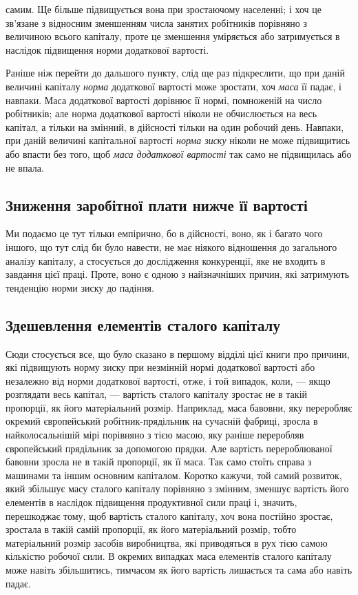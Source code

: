 \parcont{}  %
самим. Ще більше підвищується вона при зростаючому населенні; і хоч це зв’язане з відносним
зменшенням числа занятих робітників порівняно з величиною всього капіталу, проте це зменшення
уміряється або затримується в наслідок підвищення норми додаткової вартості.

Раніше ніж перейти до дальшого пункту, слід ще раз підкреслити, що при даній величині капіталу \emph{норма}
додаткової вартості може зростати, хоч \emph{маса} її падає, і навпаки. Маса додаткової вартості дорівнює
її нормі, помноженій на число робітників; але норма додаткової вартості ніколи не обчислюється на
весь капітал, а тільки на змінний, в дійсності тільки на один робочий день. Навпаки, при даній
величині капітальної вартості \emph{норма зиску} ніколи не може підвищитись або впасти без того, щоб \emph{маса
додаткової вартості} так само не підвищилась або не впала.

\subsection{Зниження заробітної плати нижче її вартості}

Ми подаємо це тут тільки емпірично, бо в дійсності, воно, як і багато чого іншого, що тут слід би
було навести, не має ніякого відношення до загального аналізу капіталу, а стосується до дослідження
конкуренції, яке не входить в завдання цієї праці. Проте, воно є одною з найзначніших причин, які
затримують тенденцію норми зиску до падіння.

\subsection{Здешевлення елементів сталого капіталу}

Сюди стосується все, що було сказано в першому відділі цієї книги про причини, які підвищують норму
зиску при незмінній нормі додаткової вартості або незалежно від норми додаткової вартості, отже, і
той випадок, коли, — якщо розглядати весь капітал, — вартість сталого капіталу зростає не в такій
пропорції, як його матеріальний розмір. Наприклад, маса бавовни, яку переробляє окремий європейський
робітник-прядільник на сучасній фабриці, зросла в найколосальнішій мірі порівняно з тією масою, яку
раніше переробляв європейський прядільник за допомогою прядки. Але вартість перероблюваної бавовни
зросла не в такій пропорції, як її маса. Так само стоїть справа
з машинами та іншим основним капіталом. Коротко кажучи, той самий розвиток, який збільшує масу
сталого капіталу порівняно з змінним, зменшує вартість його елементів в наслідок підвищення
продуктивної сили праці і, значить, перешкоджає тому, щоб вартість сталого капіталу, хоч вона
постійно зростає, зростала в такій самій пропорції, як його матеріальний розмір, тобто матеріальний
розмір засобів виробництва, які приводяться в рух тією самою кількістю робочої сили. В окремих
випадках маса елементів сталого капіталу може навіть збільшитись, тимчасом як його вартість
лишається та сама або навіть падає.

